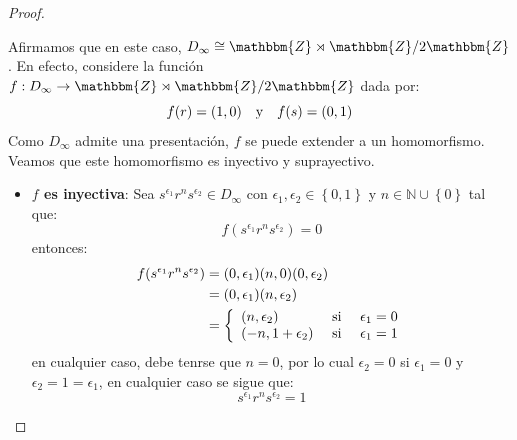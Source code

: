 \documentclass[12pt]{report}
\newcounter{it}
\theoremstyle{largebreak}
\newcommand\cf[3]{\ensuremath{#1:#2\rightarrow#3}}
\newcommand{\bbm}[1]{\ensuremath{\mathbbm{#1}}}
\begin{document}
\begin{proof}
\begin{itemize}
\begin{itemize}
\begin{equation*}
                \end{equation*}
                Afirmamos que en este caso, $D_\infty\cong\bbm{Z}\rtimes\bbm{Z}/2\bbm{Z}$. En efecto, considere la función $\cf{f}{D_\infty}{\bbm{Z}\rtimes\bbm{Z}/2\bbm{Z}}$ dada por:
                \begin{equation*}
                    f(r)=(1,0)\quad\textup{y}\quad f(s)=(0,1)
                \end{equation*}
                Como $D_\infty$ admite una presentación, $f$ se puede extender a un homomorfismo. Veamos que este homomorfismo es inyectivo y suprayectivo.
                \begin{itemize}
                    \item \textbf{$f$ es inyectiva}: Sea $s^{\epsilon_1}r^ns^{\epsilon_2}\in D_\infty$ con $\epsilon_1,\epsilon_2\in\left\{0,1\right\}$ y $n\in\mathbb{N}\cup\left\{0\right\}$ tal que:
                    \begin{equation*}
                        f(s^{\epsilon_1}r^ns^{\epsilon_2})=0
                    \end{equation*}
                    entonces:
                    \begin{equation*}
                        \begin{split}
                            f(s^{\epsilon_1}r^ns^{\epsilon_2})&=(0,\epsilon_1)(n,0)(0,\epsilon_2)\\
                            &=(0,\epsilon_1)(n,\epsilon_2)\\
                            &=\left\{
                                \begin{array}{lcr}
                                    (n, \epsilon_2) & \textup{ si } & \epsilon_1=0 \\
                                    (-n, 1+\epsilon_2) & \textup{ si } & \epsilon_1=1 \\
                                \end{array}
                            \right.\\
                        \end{split}
                    \end{equation*}
                    en cualquier caso, debe tenrse que $n=0$, por lo cual $\epsilon_2=0$ si $\epsilon_1=0$ y $\epsilon_2=1=\epsilon_1$, en cualquier caso se sigue que:
                    \begin{equation*}
                        s^{\epsilon_1}r^ns^{\epsilon_2}=1
                    \end{equation*}

\end{itemize}
\end{itemize}
\end{itemize}
\end{proof}
\end{document}
